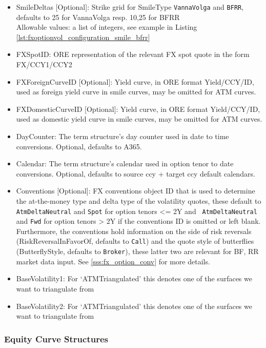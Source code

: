 \documentclass[12pt, a4paper]{article}
\begin{document}
{{\begin{itemize}
  see example in Listing \ref{lst:fxoptionvol_configuration_smile_delta}
\item SmileDeltas [Optional]: Strike grid for SmileType {\tt VannaVolga} and {\tt BFRR}, defaults to 25 for VannaVolga
  resp. 10,25 for BFRR \\ Allowable values: a list of integers, see example in Listing
  \ref{lst:fxoptionvol_configuration_smile_bfrr}
\item FXSpotID: ORE representation of the relevant FX spot quote in the form FX/CCY1/CCY2 
\item FXForeignCurveID [Optional]: Yield curve, in ORE format Yield/CCY/ID, used as foreign yield curve in smile curves,
  may be omitted for ATM curves.
\item FXDomesticCurveID [Optional]: Yield curve, in ORE format Yield/CCY/ID, used as domestic yield curve in smile
  curves, may be omitted for ATM curves.
\item DayCounter: The term structure's day counter used in date to time conversions. Optional, defaults to A365.
\item Calendar: The term structure's calendar used in option tenor to date conversions. Optional, defaults to source ccy
  + target ccy default calendars.
\item Conventions [Optional]: FX conventions object ID that is used to determine the at-the-money type and delta type of
  the volatility quotes, these default to {\tt AtmDeltaNeutral} and {\tt Spot} for option tenors <= 2Y and {\tt
    AtmDeltaNeutral} and {\tt Fwd} for option tenors > 2Y if the conventions ID is omitted or left blank. Furthermore,
  the conventions hold information on the side of risk reversals (RiskReversalInFavorOf, defaults to {\tt Call}) and the
  quote style of butterflies (ButterflyStyle, defaults to {\tt Broker}), these latter two are relevant for BF, RR market
  data input. See \ref{sss:fx_option_conv} for more details.
\item BaseVolatility1: For `ATMTriangulated' this denotes one of the surfaces we want to triangulate from
\item BaseVolatility2: For `ATMTriangulated' this denotes one of the surfaces we want to triangulate from
\end{itemize}

\subsubsection{Equity Curve Structures}

}}
\end{document}
